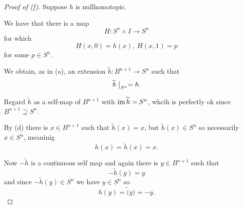 \documentclass[11pt]{article}
\begin{document}
\begin{proof}[Proof of (f)]
    Suppose $h$ is nullhomotopic. 

    We have that there is a map 
    \[
        H : S^n \times I \to S^n 
    \]
    for which 
    \[
        H(x,0) = h(x), \ H(x,1) = p 
    \]
    for some $p \in S^n$.  

    We obtain, as in (a), an 
    extension $\widetilde h : B^{n+1} \to S^n$ such that 
    \[
        \widetilde h \bigm|_{S^n} = h. 
    \]

    Regard $\widetilde h$ as a self-map of 
    $B^{n+1}$ with $\operatorname{im} \widetilde h = S^n$, whcih 
    is perfectly ok since $B^{n+1} \supseteq S^n$. 

    By (d) there is $x \in B^{n+1}$ such that 
    $\widetilde h(x) = x$, but 
    $\widetilde h(x) \in S^n$ so necessarily 
    $x \in S^n$, meaninig 
    \[
        h(x) = \widetilde h(x) = x. 
    \]

    Now $- \widetilde h$ is a continuous 
    self map and again there is 
    $y \in B^{n+1}$ such that 
    \[
        -\widetilde h(y) = y 
    \]
    and since $-\widetilde h(y) \in S^n$ we 
    have $y \in S^n$ so 
    \[
        h(y) = \widetilde(y) = -y. 
    \]
    
\end{proof}
\end{document}
